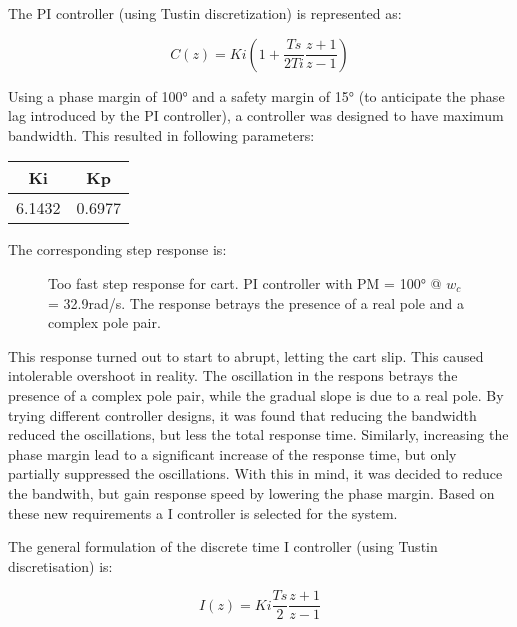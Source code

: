 \documentclass[a4paper]{article}
\newcommand{\newpar}{\vspace{.3cm}\noindent}
\begin{document}
The PI controller (using Tustin discretization) is represented as:

\begin{equation}
    C(z) = Ki \left( 1 + \frac{Ts}{2Ti}\frac{z+1}{z-1}\right)
\end{equation}

\newpar
Using a phase margin of 100° and a safety margin of 15° (to anticipate the phase lag introduced by the PI controller), a controller was designed to have maximum bandwidth. This resulted in following parameters:

\begin{center}
    \begin{tabular}{|c|c|}
        \hline
         Ki & Kp \\
        \hline
         6.1432 & 0.6977 \\
        \hline
    \end{tabular}
    \label{tab:KiKpPIPM100}
\end{center}

\newpar
The corresponding step response is:

\begin{figure}[H]
    \caption{Too fast step response for cart. PI controller with PM = 100° @ $w_{c}$ = 32.9rad/s. The response betrays the presence of a real pole and a complex pole pair.}
    \label{fig:topfastPI}
\end{figure}

\newpar
This response turned out to start to abrupt, letting the cart slip. This caused intolerable overshoot in reality. The oscillation in the respons betrays the presence of a complex pole pair, while the gradual slope is due to a real pole. By trying different controller designs, it was found that reducing the bandwidth reduced the oscillations, but less the total response time. Similarly, increasing the phase margin lead to a significant increase of the response time, but only partially suppressed the oscillations. With this in mind, it was decided to reduce the bandwith, but gain response speed by lowering the phase margin. Based on these new requirements a I controller is selected for the system.

\newpar
The general formulation of the discrete time I controller (using Tustin discretisation) is:

\begin{equation}
    I(z) = Ki \frac{Ts}{2}\frac{z+1}{z-1}
\end{equation}
\end{document}
